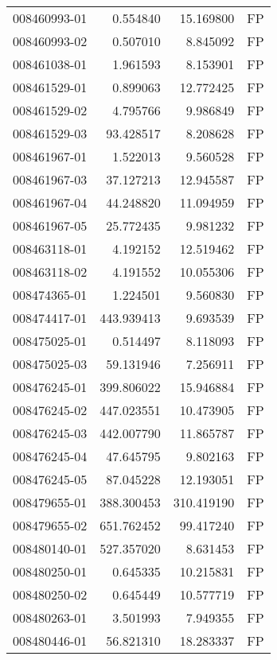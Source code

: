 \begin{tabular}{lrrl}
008460993-01 &    0.554840 &      15.169800 &   FP \\
008460993-02 &    0.507010 &       8.845092 &   FP \\
008461038-01 &    1.961593 &       8.153901 &   FP \\
008461529-01 &    0.899063 &      12.772425 &   FP \\
008461529-02 &    4.795766 &       9.986849 &   FP \\
008461529-03 &   93.428517 &       8.208628 &   FP \\
008461967-01 &    1.522013 &       9.560528 &   FP \\
008461967-03 &   37.127213 &      12.945587 &   FP \\
008461967-04 &   44.248820 &      11.094959 &   FP \\
008461967-05 &   25.772435 &       9.981232 &   FP \\
008463118-01 &    4.192152 &      12.519462 &   FP \\
008463118-02 &    4.191552 &      10.055306 &   FP \\
008474365-01 &    1.224501 &       9.560830 &   FP \\
008474417-01 &  443.939413 &       9.693539 &   FP \\
008475025-01 &    0.514497 &       8.118093 &   FP \\
008475025-03 &   59.131946 &       7.256911 &   FP \\
008476245-01 &  399.806022 &      15.946884 &   FP \\
008476245-02 &  447.023551 &      10.473905 &   FP \\
008476245-03 &  442.007790 &      11.865787 &   FP \\
008476245-04 &   47.645795 &       9.802163 &   FP \\
008476245-05 &   87.045228 &      12.193051 &   FP \\
008479655-01 &  388.300453 &     310.419190 &   FP \\
008479655-02 &  651.762452 &      99.417240 &   FP \\
008480140-01 &  527.357020 &       8.631453 &   FP \\
008480250-01 &    0.645335 &      10.215831 &   FP \\
008480250-02 &    0.645449 &      10.577719 &   FP \\
008480263-01 &    3.501993 &       7.949355 &   FP \\
008480446-01 &   56.821310 &      18.283337 &   FP \\

\end{tabular}
